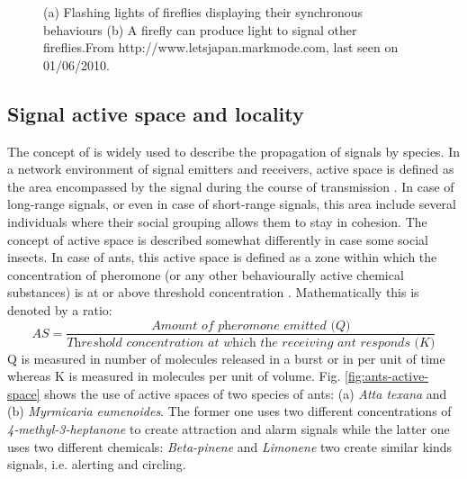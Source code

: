 \begin{figure}[htp]
\centering
{} 
\hspace{0.25cm}
\caption{(a) Flashing lights of fireflies displaying their synchronous behaviours (b) A firefly can produce light to signal other fireflies.\protect\newline From http://www.letsjapan.markmode.com, last seen on 01/06/2010.}
\label{fig:fireflies}
\end{figure}
\subsection{Signal active space and locality}
The concept of  is widely used to describe the propagation of signals by species. In a network environment of signal emitters and receivers, active space is defined as the area encompassed by the signal during the course of transmission \cite{Mcgregor2000}. In case of long-range signals, or even in case of short-range signals, this area include several individuals where their social grouping allows them to stay in cohesion. The concept of active space is described somewhat differently in case some social insects. In case of ants, this active space is defined as a zone within which the concentration of pheromone (or any other behaviourally active chemical substances) is at or above threshold concentration \cite{Holldobler1990}. Mathematically this is denoted by a ratio:
\begin{equation}
AS = \frac{\textit{Amount of pheromone emitted (Q)}}{\textit{Threshold concentration at which the receiving ant responds (K)}}
\end{equation}
Q is measured in number of molecules released in a burst or in per unit of time whereas K is measured in molecules per unit of volume. 
Fig. \ref{fig:ants-active-space} shows the use of active spaces of two species of ants: (a) {\em Atta texana} and (b) {\em Myrmicaria eumenoides}.  The former one uses two different concentrations of {\em 4-methyl-3-heptanone} to create attraction and alarm signals while the latter one uses two different chemicals: {\em Beta-pinene} and {\em Limonene} two create similar kinds signals, i.e. alerting and circling.\\ 
